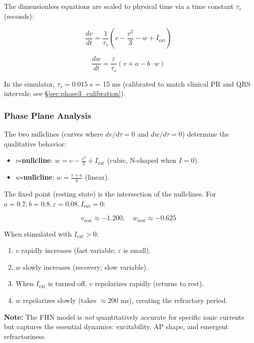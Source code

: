 \documentclass[12pt,oneside,a4paper]{book}
\newcommand{\note}[1]{\textbf{Note:} #1}
\begin{document}
The dimensionless equations are scaled to physical time via a time constant $\tau_s$ (seconds):

\begin{equation}
\frac{dv}{dt} = \frac{1}{\tau_s}\left(v - \frac{v^3}{3} - w + I_{\text{ext}}\right)
\end{equation}

\begin{equation}
\frac{dw}{dt} = \frac{\varepsilon}{\tau_s}(v + a - b \cdot w)
\end{equation}

In the simulator, $\tau_s = 0.015$ s = 15 ms (calibrated to match clinical PR and QRS intervals; see \S\ref{sec:phase3_calibration}).

\subsubsection{Phase Plane Analysis}

The two nullclines (curves where $dv/d\tau = 0$ and $dw/d\tau = 0$) determine the qualitative behavior:

\begin{itemize}
  \item \textbf{$v$-nullcline}: $w = v - \frac{v^3}{3} + I_{\text{ext}}$ (cubic, N-shaped when $I=0$).
  \item \textbf{$w$-nullcline}: $w = \frac{v + a}{b}$ (linear).
\end{itemize}

The fixed point (resting state) is the intersection of the nullclines. For $a = 0.7, b = 0.8, \varepsilon = 0.08, I_{\text{ext}} = 0$:

$$v_{\text{rest}} \approx -1.200, \quad w_{\text{rest}} \approx -0.625$$

When stimulated with $I_{\text{ext}} > 0$:

\begin{enumerate}
  \item $v$ rapidly increases (fast variable; $\varepsilon$ is small).
  \item $w$ slowly increases (recovery; slow variable).
  \item When $I_{\text{ext}}$ is turned off, $v$ repolarizes rapidly (returns to rest).
  \item $w$ repolarizes slowly (takes $\approx 200$ ms), creating the refractory period.
\end{enumerate}

\note{The FHN model is \emph{not} quantitatively accurate for specific ionic currents but captures the essential dynamics: excitability, AP shape, and emergent refractoriness.}
\end{document}
